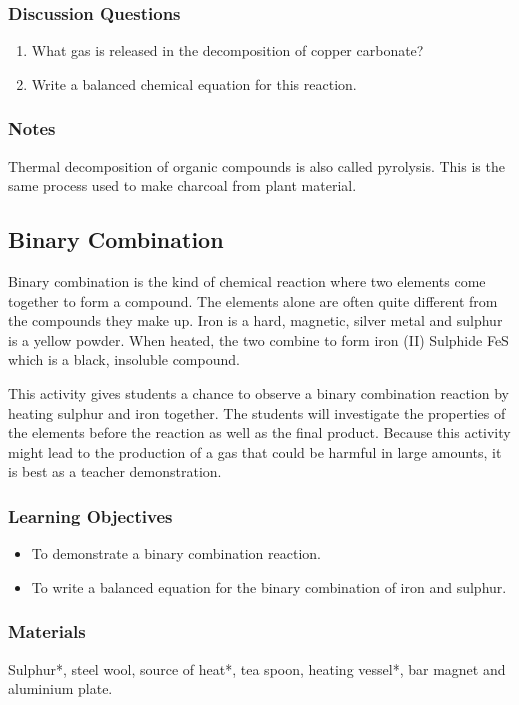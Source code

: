 \subsubsection*{Discussion Questions}
\begin{enumerate}
\item{What gas is released in the decomposition of copper carbonate?}
\item{Write a balanced chemical equation for this reaction.}
\end{enumerate}

\subsubsection*{Notes}
Thermal decomposition of organic compounds is also called pyrolysis. This is the same process used to make charcoal from plant material.

\subsection{Binary Combination}
Binary combination is the kind of chemical reaction where two elements come together to form a compound. The elements alone are often quite different from the compounds they make up. Iron is a hard, magnetic, silver metal and sulphur is a yellow powder. When heated, the two combine to form iron (II) Sulphide FeS which is a black, insoluble compound. 

This activity gives students a chance to observe a binary combination reaction by heating sulphur and iron together. The students will investigate the properties of the elements before the reaction as well as the final product. Because this activity might lead to the production of a gas that could be harmful in large amounts, it is best as a teacher demonstration.

\subsubsection*{Learning Objectives}
\begin{itemize}
\item{To demonstrate a binary combination reaction.}
\item{To write a balanced equation for the binary combination of iron and sulphur.}
\end{itemize}

\subsubsection*{Materials}
Sulphur*, steel wool, source of heat*, tea spoon, heating vessel*, bar magnet and aluminium plate.

